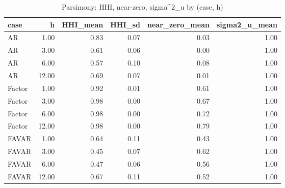 \begin{table}[ht]
\centering
\begin{tabular}{lrrrrr}
  \hline
case & h & HHI\_mean & HHI\_sd & near\_zero\_mean & sigma2\_u\_mean \\ 
  \hline
AR & 1.00 & 0.83 & 0.07 & 0.03 & 1.00 \\ 
  AR & 3.00 & 0.61 & 0.06 & 0.00 & 1.00 \\ 
  AR & 6.00 & 0.57 & 0.10 & 0.08 & 1.00 \\ 
  AR & 12.00 & 0.69 & 0.07 & 0.01 & 1.00 \\ 
  Factor & 1.00 & 0.92 & 0.01 & 0.61 & 1.00 \\ 
  Factor & 3.00 & 0.98 & 0.00 & 0.67 & 1.00 \\ 
  Factor & 6.00 & 0.98 & 0.00 & 0.72 & 1.00 \\ 
  Factor & 12.00 & 0.98 & 0.00 & 0.79 & 1.00 \\ 
  FAVAR & 1.00 & 0.64 & 0.11 & 0.43 & 1.00 \\ 
  FAVAR & 3.00 & 0.45 & 0.07 & 0.62 & 1.00 \\ 
  FAVAR & 6.00 & 0.47 & 0.06 & 0.56 & 1.00 \\ 
  FAVAR & 12.00 & 0.67 & 0.11 & 0.52 & 1.00 \\ 
   \hline
\end{tabular}
\caption{Parsimony: HHI, near-zero, sigma^2_u by (case, h)} 
\label{tab:parsimony}
\end{table}
